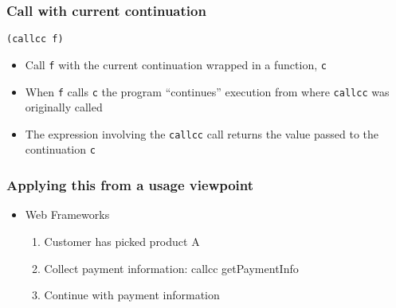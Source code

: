 \documentclass{beamer}
\begin{document}
\begin{frame}[fragile]
\frametitle{Call with current continuation}

\begin{lstlisting}
(callcc f)
\end{lstlisting}

\begin{itemize}
\item Call \texttt{f} with the current continuation wrapped in a
  function, \texttt{c}
\item When \texttt{f} calls \texttt{c} the program ``continues''
  execution from where \texttt{callcc} was originally called
\item The expression involving the \texttt{callcc} call returns the
  value passed to the continuation \texttt{c}
\end{itemize}





\end{frame}


\begin{frame}[fragile]
\frametitle{Applying this from a usage viewpoint}
\begin{itemize}
\item Web Frameworks
  \begin{enumerate}
  \item Customer has picked product A
  \item Collect payment information: callcc getPaymentInfo
  \item Continue with payment information
  \end{enumerate}
\end{itemize}

\end{frame}
\end{document}
